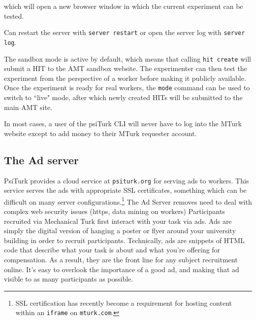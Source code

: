 \documentclass[twocolumn]{svjour3}          %
\begin{document}
\noindent which will open a new browser window in which the current experiment can be tested.

Can restart the server with \texttt{server restart} or open the server log with \texttt{server log}. 

The sandbox mode is active by default, which means that calling \texttt{hit create} will submit a HIT to the AMT sandbox website.
The experimenter can then test the experiment from the perspective of a worker before making it publicly available.
Once the experiment is ready for real workers, the \texttt{mode} command can be used to switch to ``live" mode, after which newly created HITs will be submitted to the main AMT site.

In most cases, a user of the
psiTurk CLI will never have to log into the MTurk website except to add money to their MTurk
requester account.


\subsection{The Ad server}

PsiTurk provides a cloud service at \texttt{psiturk.org} for serving ads to workers.
This service serves the ads with appropriate SSL certificates, something which can be difficult on many server configurations.\footnote{SSL certification has recently become a requirement for hosting content within an \texttt{iframe} on \texttt{mturk.com}.}
The Ad Server removes need to deal with complex web security issues (https, data mining on workers) 
Participants recruited via Mechanical Turk first interact with your task via ads. Ads are simply the digital version of hanging a poster or flyer around your university building in order to recruit participants. Technically, ads are snippets of HTML code that describe what your task is about and what you're offering for compensation. As a result, they are the front line for any subject recruitment online. It's easy to overlook the importance of a good ad, and making that ad visible to as many participants as possible.





%
%
%
%
%
\end{document}
